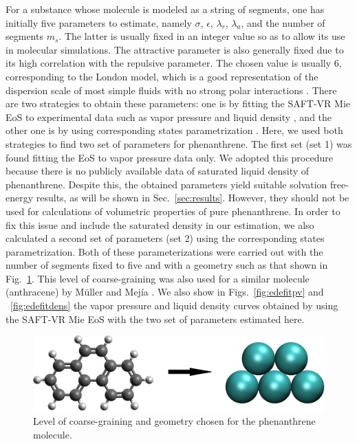 \documentclass[preprint]{elsarticle}
\begin{document}
	For a substance whose molecule is modeled as a string of segments, one has initially five parameters to estimate, namely $\sigma$, $\epsilon$, $\lambda_r$, $\lambda_a$, and the number of segments $m_s$. The latter is usually fixed in an integer value so as to allow its use in molecular simulations. The attractive parameter is also generally fixed due to its high correlation with the repulsive parameter. The chosen value is usually $6$, corresponding to the London model, which is a good representation of the dispersion scale of most simple fluids with no strong polar interactions \cite{ramrattan2015,herdes2015}. There are two strategies to obtain these parameters: one is by fitting the SAFT-VR Mie EoS to experimental data such as vapor pressure and liquid density \cite{avendano2013}, and the other one is by using corresponding states parametrization \cite{mejia2014, muller2017}. Here, we used both strategies to find two set of parameters for phenanthrene. The first set (set 1) was found fitting the EoS to vapor pressure data \cite{murphy,osborn} only. We adopted this procedure because there is  no publicly available data of saturated liquid density of phenanthrene. Despite this, the obtained parameters yield suitable solvation free-energy results, as will be shown in Sec.~\ref{sec:results}. However, they should not be used for calculations of volumetric properties of pure phenanthrene. In order to fix this issue and include the saturated density in our estimation, we also calculated a second set of parameters (set 2) using the corresponding states parametrization. Both of these parameterizations were carried out with the number of segments fixed to five and with a geometry such as that shown in Fig.~\ref{fig:fen5}. This level of coarse-graining was also used for a similar molecule (anthracene) by M\"{u}ller and Mej\'{i}a \cite{muller2017}. We also show in Figs.~\ref{fig:edefitpv} and ~\ref{fig:edefitdens} the vapor pressure and liquid density curves obtained by using the SAFT-VR Mie EoS with the two set of parameters estimated here.
	
	\begin{figure}
		\includegraphics[width=0.9\columnwidth]{Figures/phenanthrene.eps}
		\caption{Level of coarse-graining and geometry chosen for the phenanthrene molecule.}
		\label{fig:fen5}
	\end{figure}
	
\end{document}
